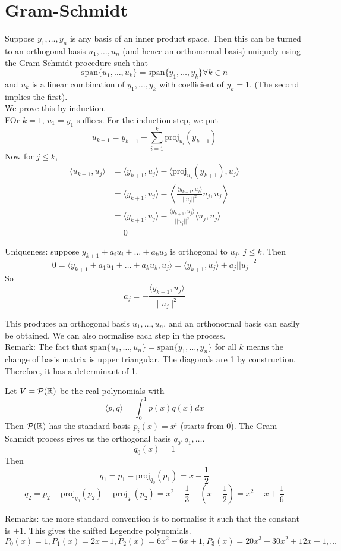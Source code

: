 \documentclass[12pt]{article}
\begin{document}
\section{Gram-Schmidt}

Suppose $y_1,\dots,y_n$ is any basis of an inner product space. Then this can be turned to an orthogonal basis $u_1,\dots,u_n$ (and hence an orthonormal basis) uniquely using the Gram-Schmidt procedure such that
$$\text{span}\{u_1,\dots,u_k\} = \text{span}\{y_1,\dots,y_k\} \forall k\in n$$
and $u_k$ is a linear combination of $y_1,\dots,y_k$ with coefficient of $y_k=1$. (The second implies the first). \\
We prove this by induction. \\
FOr $k=1$, $u_1=y_1$ suffices. For the induction step, we put
$$u_{k+1} = y_{k+1} - \sum_{i=1}^k \text{proj}_{u_i}(y_{k+1})$$
Now for $j\leq k$,
\begin{align*}
		\langle u_{k+1},u_j \rangle &= \langle y_{k+1},u_j \rangle - \langle \text{proj}_{u_j} (y_{k+1}),u_j \rangle \\
		&= \langle y_{k+1},u_j \rangle - \left\langle \frac{\langle y_{k+1},u_j \rangle}{||u_j||^2}u_j,u_j \right\rangle \\
		&= \langle y_{k+1},u_j \rangle - \frac{\langle y_{k+1},u_j \rangle}{||u_j||^2}\langle u_j,u_j \rangle \\
		&= 0
\end{align*}

Uniqueness: suppose $y_{k+1} + a_iu_i + \dots + a_ku_k$ is orthogonal to $u_j$, $j\leq k$. Then
$$0 = \langle y_{k+1} + a_1u_1 + \dots + a_ku_k,u_j \rangle = \langle y_{k+1},u_j \rangle + a_j||u_j||^2$$
So
$$a_j = -\frac{\langle y_{k+1},u_j \rangle}{||u_j||^2}$$

This produces an orthogonal basis $u_1,\dots,u_n$, and an orthonormal basis can easily be obtained. We can also normalise each step in the process. \\

Remark: The fact that $\text{span}\{u_1,\dots,u_n\} = \text{span}\{y_1,\dots,y_n\}$ for all $k$ means the change of basis matrix is upper triangular. The diagonals are 1 by construction. Therefore, it has a determinant of 1.

\begin{ex}
	Let $V = \mathcal{P}(\mathbb{R})$ be the real polynomials with
	$$\langle p,q \rangle = \int_0^1 p(x)q(x)dx$$
	Then $\mathcal{P}(\mathbb{R})$ has the standard basis $p_i(x) = x^i$ (starts from 0). The Gram-Schmidt process gives us the orthogonal basis $q_0,q_1,\dots$.
	$$q_0(x) = 1$$
	Then
	$$q_1 = p_1 - \text{proj}_{q_0}(p_1) = x - \frac{1}{2}$$
	$$q_2 = p_2 - \text{proj}_{q_0}(p_2) - \text{proj}_{q_1}(p_2) = x^2 - \frac{1}{3} - (x - \frac{1}{2}) = x^2 - x + \frac{1}{6}$$
\end{ex}

Remarks: the more standard convention is to normalise it such that the constant is $\pm1$. This gives the shifted Legendre polynomials.
$$P_0(x) = 1, P_1(x) = 2x-1, P_2(x) = 6x^2-6x+1, P_3(x) = 20x^3 - 30x^2 + 12x - 1,\dots$$
\end{document}

